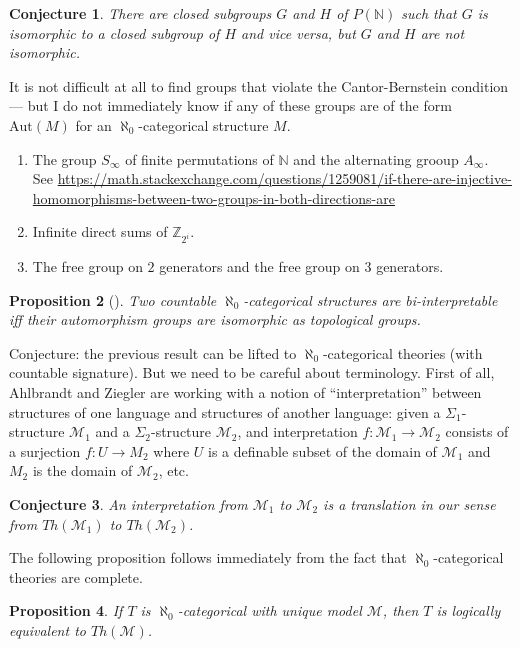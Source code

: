 \documentclass[12pt]{article}
\newtheorem{prop}{Proposition}
\newtheorem{conj}[prop]{Conjecture}
\theoremstyle{definition}
\theoremstyle{remark}
\newcommand{\3}{\mathcal}
\begin{document}
\begin{conj} There are closed subgroups $G$ and $H$ of
  $P(\mathbb{N})$ such that $G$ is isomorphic to a closed subgroup of
  $H$ and vice versa, but $G$ and $H$ are not
  isomorphic. \end{conj}

It is not difficult at all to find groups that violate the
Cantor-Bernstein condition --- but I do not immediately know if any of
these groups are of the form $\mathrm{Aut}(M)$ for an
$\aleph _0$-categorical structure $M$.

\begin{enumerate}
\item The group $S_\infty$ of finite permutations of $\mathbb{N}$ and
  the alternating grooup $A_\infty$. See  \url{https://math.stackexchange.com/questions/1259081/if-there-are-injective-homomorphisms-between-two-groups-in-both-directions-are}
\item Infinite direct sums of $\mathbb{Z}_{2^i}$.
\item The free group on $2$ generators and the free group on $3$ generators.  
\end{enumerate}

\begin{prop}[\cite{ahlbrandt1986}] Two countable
  $\aleph _0$-categorical structures are bi-interpretable iff their
  automorphism groups are isomorphic as topological groups. \end{prop}

Conjecture: the previous result can be lifted to
$\aleph _0$-categorical theories (with countable signature). But we
need to be careful about terminology. First of all, Ahlbrandt and
Ziegler are working with a notion of ``interpretation'' between
structures of one language and structures of another language: given a
$\Sigma _1$-structure $\3M _1$ and a $\Sigma _2$-structure $\3M _2$,
and interpretation $f:\3M_1\to \3M_2$ consists of a surjection
$f:U\to M_2$ where $U$ is a definable subset of the domain of $\3M_1$
and $M_2$ is the domain of $\3M_2$, etc.

\begin{conj} An interpretation from $\3M_1$ to $\3M_2$ is a
  translation in our sense from $Th(\3M_1)$ to $Th(\3M_2)$. \end{conj}

The following proposition follows immediately from the fact that
$\aleph _0$-categorical theories are complete.

\begin{prop} If $T$ is $\aleph _0$-categorical with unique model
  $\3M$, then $T$ is logically equivalent to $Th(\3M )$. \end{prop}
\end{document}
